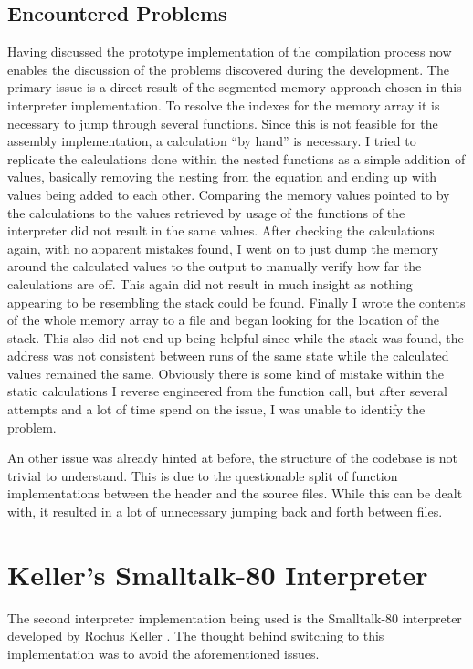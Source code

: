 \subsection{Encountered Problems}
Having discussed the prototype implementation of the compilation process now enables the discussion of the problems discovered during the development. 
The primary issue is a direct result of the segmented memory approach chosen in this interpreter implementation. 
To resolve the indexes for the memory array it is necessary to jump through several functions. Since this is not feasible for the assembly implementation, a calculation \enquote{by hand} is necessary. 
I tried to replicate the calculations done within the nested functions as a simple addition of values, basically removing the nesting from the equation and ending up with values being added to each other. 
Comparing the memory values pointed to by the calculations to the values retrieved by usage of the functions of the interpreter did not result in the same values. 
After checking the calculations again, with no apparent mistakes found, I went on to just dump the memory around the calculated values to the output to manually verify how far the calculations are off. This again did not result in much insight as nothing appearing to be resembling the stack could be found.
Finally I wrote the contents of the whole memory array to a file and began looking for the location of the stack. This also did not end up being helpful since while the stack was found, the address was not consistent between runs of the same state while the calculated values remained the same.
Obviously there is some kind of mistake within the static calculations I reverse engineered from the function call, but after several attempts and a lot of time spend on the issue, I was unable to identify the problem.

An other issue was already hinted at before, the structure of the codebase is not trivial to understand. This is due to the questionable split of function implementations between the header and the source files. While this can be dealt with, it resulted in a lot of unnecessary jumping back and forth between files. 

\section{Keller's Smalltalk-80 Interpreter}
The second interpreter implementation being used is the Smalltalk-80 interpreter developed by Rochus Keller \cite{Keller2021}. The thought behind switching to this implementation was to avoid the aforementioned issues. 

